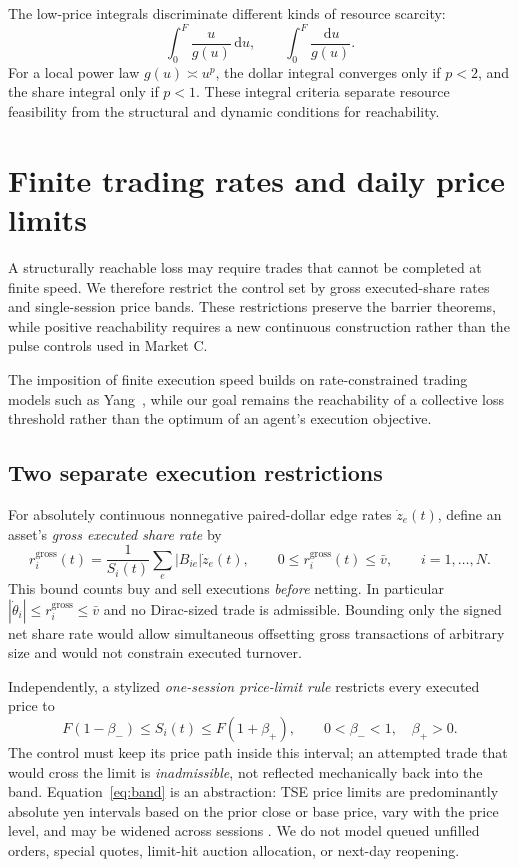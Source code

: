 \documentclass[11pt]{article}
\numberwithin{equation}{section}
\theoremstyle{definition}
\theoremstyle{remark}
\newcommand{\dd}{\,\mathrm{d}}
\begin{document}
The low-price integrals discriminate different kinds of resource scarcity:
\begin{equation}\label{eq:lowprice}
\int_0^F\frac{u}{g(u)}\dd u,\qquad
\int_0^F\frac{\dd u}{g(u)}.
\end{equation}
For a local power law $g(u)\asymp u^p$, the dollar integral converges only if $p<2$, and the share integral only if $p<1$. These integral criteria separate resource feasibility from the structural and dynamic conditions for reachability.


\section{Finite trading rates and daily price limits}\label{sec:rateband}
A structurally reachable loss may require trades that cannot be completed at finite speed. We therefore restrict the control set by gross executed-share rates and single-session price bands. These restrictions preserve the barrier theorems, while positive reachability requires a new continuous construction rather than the pulse controls used in Market C.

The imposition of finite execution speed builds on rate-constrained trading models such as Yang~\citep{Yang2019}, while our goal remains the reachability of a collective loss threshold rather than the optimum of an agent's execution objective.

\subsection{Two separate execution restrictions}
For absolutely continuous nonnegative paired-dollar edge rates $\dot z_e(t)$, define an asset's \emph{gross executed share rate} by
\begin{equation}\label{eq:grossrate}
 r_i^{\mathrm{gross}}(t)=\frac{1}{S_i(t)}\sum_e |B_{ie}|\dot z_e(t),\qquad
 0\le r_i^{\mathrm{gross}}(t)\le\bar v,\qquad i=1,\ldots,N.
\end{equation}
This bound counts buy and sell executions \emph{before} netting. In particular $|\dot\theta_i|\le r_i^{\mathrm{gross}}\le\bar v$ and no Dirac-sized trade is admissible. Bounding only the signed net share rate would allow simultaneous offsetting gross transactions of arbitrary size and would not constrain executed turnover.

Independently, a stylized \emph{one-session price-limit rule} restricts every executed price to
\begin{equation}\label{eq:band}
 F(1-\beta_-)\le S_i(t)\le F(1+\beta_+),\qquad
 0<\beta_-<1,\quad\beta_+>0.
\end{equation}
The control must keep its price path inside this interval; an attempted trade that would cross the limit is \emph{inadmissible}, not reflected mechanically back into the band. Equation~\eqref{eq:band} is an abstraction: TSE price limits are predominantly absolute yen intervals based on the prior close or base price, vary with the price level, and may be widened across sessions \citep{JPX2026}. We do not model queued unfilled orders, special quotes, limit-hit auction allocation, or next-day reopening.
\end{document}

